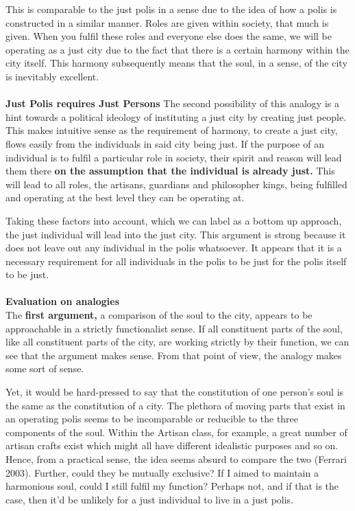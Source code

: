 \documentclass[12pt, letterpaper]{article}
\begin{document}
This is comparable to the just polis in a sense due to the idea of how a polis is constructed in a similar manner. Roles are given within society, that much is given. When you fulfil these roles and everyone else does the same, we will be operating as a just city due to the fact that there is a certain harmony within the city itself. This harmony subsequently means that the soul, in a sense, of the city is inevitably excellent. \\\\
\textbf{Just Polis requires Just Persons}
The second possibility of this analogy is a hint towards a political ideology of instituting a just city by creating just people. This makes intuitive sense as the requirement of harmony, to create a just city, flows easily from the individuals in said city being just. If the purpose of an individual is to fulfil a particular role in society, their spirit and reason will lead them there \textbf{on the assumption that the individual is already just.} This will lead to all roles, the artisans, guardians and philosopher kings, being fulfilled and operating at the best level they can be operating at.

Taking these factors into account, which we can label as a bottom up approach, the just individual will lead into the just city. This argument is strong because it does not leave out any individual in the polis whatsoever. It appears that it is a necessary requirement for all individuals in the polis to be just for the polis itself to be just. \\\\
\textbf{Evaluation on analogies}\\
The \textbf{first argument,} a comparison of the soul to the city, appears to be approachable in a strictly functionalist sense. If all constituent parts of the soul, like all constituent parts of the city, are working strictly by their function, we can see that the argument makes sense. From that point of view, the analogy makes some sort of sense.

Yet, it would be hard-pressed to say that the constitution of one person's soul is the same as the constitution of a city. The plethora of moving parts that exist in an operating polis seems to be incomparable or reducible to the three components of the soul. Within the Artisan class, for example, a great number of artisan crafts exist which might all have different idealistic purposes and so on. Hence, from a practical sense, the idea seems absurd to compare the two (Ferrari 2003). Further, could they be mutually exclusive? If I aimed to maintain a harmonious soul, could I still fulfil my function? Perhaps not, and if that is the case, then it'd be unlikely for a just individual to live in a just polis.
\end{document}
